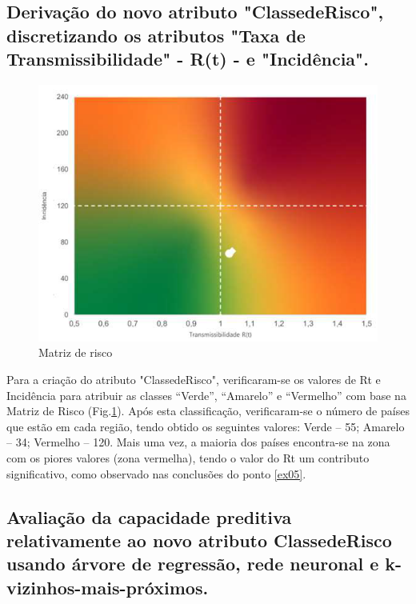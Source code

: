 \documentclass[conference]{IEEEtran}
\begin{document}
\subsection{Derivação do novo atributo "ClassedeRisco", discretizando os atributos "Taxa de Transmissibilidade" - R(t) - e "Incidência".}
\begin{figure}[htbp]
\centerline{\includegraphics[width=0.95\columnwidth]{images/matrix.png}}
\caption{Matriz de risco}
\label{matrix}
\end{figure}
Para a criação do atributo "ClassedeRisco", verificaram-se os valores de Rt e Incidência para atribuir as classes “Verde”, “Amarelo” e “Vermelho” com base na Matriz de Risco (Fig.\ref{matrix}).
Após esta classificação, verificaram-se o número de países que estão em cada região, tendo obtido os seguintes valores:
Verde – 55;
Amarelo – 34;
Vermelho – 120.
Mais uma vez, a maioria dos países encontra-se na zona com os piores valores (zona vermelha), tendo o valor do Rt um contributo significativo, como observado nas conclusões do ponto \ref{ex05}.



\subsection{Avaliação da capacidade preditiva relativamente ao novo atributo ClassedeRisco usando árvore de regressão, rede neuronal e k-vizinhos-mais-próximos.}
\end{document}
